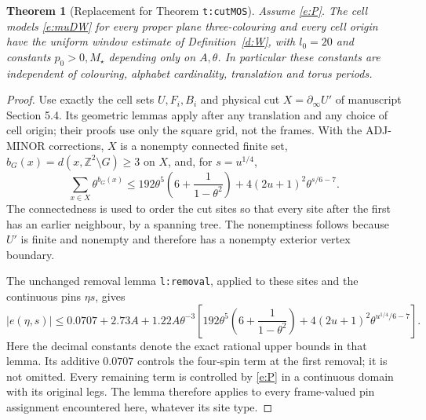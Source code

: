 \documentclass[11pt,reqno]{amsart}
\newtheorem{theorem}{Theorem}[section]
\theoremstyle{definition}
\newcommand{\Z}{\mathbb Z}
\begin{document}
\begin{theorem}[Replacement for Theorem \texttt{t:cutMOS}]
\label{t:cutMOS}
Assume \eqref{e:P}. The cell models \eqref{e:muDW} for every proper
plane three-colouring and every cell origin have the uniform window
estimate of Definition~\ref{d:W}, with $l_0=20$ and constants
$p_0>0,M_\star$ depending only on $A,\theta$. In particular these
constants are independent of colouring, alphabet cardinality,
translation and torus periods.
\end{theorem}
\begin{proof}
Use exactly the cell sets $U,F_i,B_i$ and physical cut
$X=\partial_\infty U'$ of manuscript Section 5.4. Its geometric
lemmas apply after any translation and any choice of cell origin;
their proofs use only the square grid, not the frames. With the
ADJ-MINOR corrections, $X$ is a nonempty connected finite set,
$b_G(x)=d(x,\Z^2\setminus G)\ge3$ on $X$, and, for $s=u^{1/4}$,
\begin{equation}\label{e:cutsum}
 \sum_{x\in X}\theta^{b_G(x)}
 \le192\theta^5\left(6+\frac1{1-\theta^2}\right)
        +4(2u+1)^2\theta^{s/6-7}.
\end{equation}
The connectedness is used to order the cut sites so that every site
after the first has an earlier neighbour, by a spanning tree. The
nonemptiness follows because $U'$ is finite and nonempty and therefore
has a nonempty exterior vertex boundary.

The unchanged removal lemma \texttt{l:removal}, applied to these sites
and the continuous pins $\eta s$, gives
\begin{equation}\label{e:epsilon}
 |e(\eta,s)|\le0.0707+2.73A+
   1.22A\theta^{-3}\left[
     192\theta^5\left(6+\frac1{1-\theta^2}\right)
           +4(2u+1)^2\theta^{u^{1/4}/6-7}\right].
\end{equation}
Here the decimal constants denote the exact rational upper bounds
in that lemma. Its additive $0.0707$ controls the four-spin term
at the first removal; it is not omitted. Every remaining term is
controlled by \eqref{e:P} in a continuous domain with its original
legs. The lemma therefore applies to every frame-valued pin
assignment encountered here, whatever its site type.


\end{proof}
\end{document}
